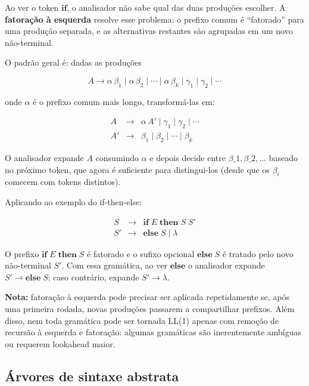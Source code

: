   Ao ver o token \(\mathbf{if}\), o analisador não sabe qual das duas
  produções escolher. A \textbf{fatoração à esquerda} resolve esse
  problema: o prefixo comum é ``fatorado'' para uma produção separada,
  e as alternativas restantes são agrupadas em um novo não-terminal.

  O padrão geral é: dadas as produções

  \[
    A \to \alpha\,\beta_1 \mid \alpha\,\beta_2 \mid \cdots \mid
    \alpha\,\beta_k \mid \gamma_1 \mid \gamma_2 \mid \cdots
  \]

  onde \(\alpha\) é o prefixo comum mais longo, transformá-las em:

  \[
    \begin{array}{lcl}
      A  & \to & \alpha\,A' \mid \gamma_1 \mid \gamma_2 \mid \cdots\\
      A' & \to & \beta_1 \mid \beta_2 \mid \cdots \mid \beta_k
    \end{array}
  \]

  O analisador expande \(A\) consumindo \(\alpha\) e depois decide
  entre $\beta\_1, \beta\_2, \ldots$
  baseado no próximo token, que agora é suficiente para distingui-los
  (desde que os \(\beta_i\) comecem com tokens distintos).

  Aplicando ao exemplo do if-then-else:

  \[
    \begin{array}{lcl}
      S  & \to & \mathbf{if}\;E\;\mathbf{then}\;S\;S'\\
      S' & \to & \mathbf{else}\;S \mid \lambda
    \end{array}
  \]

  O prefixo \(\mathbf{if}\;E\;\mathbf{then}\;S\) é fatorado e o sufixo
  opcional \(\mathbf{else}\;S\) é tratado pelo novo não-terminal
  \(S'\). Com essa gramática, ao ver \(\mathbf{else}\) o analisador
  expande \(S' \to \mathbf{else}\;S\); caso contrário, expande \(S'
  \to \lambda\).

  \textbf{Nota:} fatoração à esquerda pode precisar ser aplicada
  repetidamente se, após uma primeira rodada, novas produções
  passarem a compartilhar prefixos. Além disso, nem toda gramática
  pode ser tornada LL(1) apenas com remoção de recursão à esquerda e
  fatoração: algumas gramáticas são inerentemente ambíguas ou
  requerem lookahead maior.

  \subsection{Árvores de sintaxe abstrata}

